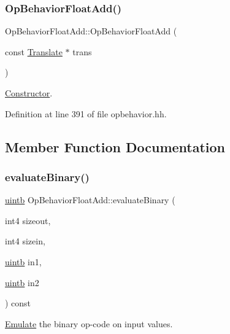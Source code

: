 \subsubsection{\texorpdfstring{OpBehaviorFloatAdd()}{OpBehaviorFloatAdd()}}
{\footnotesize\ttfamily Op\+Behavior\+Float\+Add\+::\+Op\+Behavior\+Float\+Add (\begin{DoxyParamCaption}\item[{const \mbox{\hyperlink{class_translate}{Translate}} $\ast$}]{trans }\end{DoxyParamCaption})\hspace{0.3cm}{\ttfamily [inline]}}



\mbox{\hyperlink{class_constructor}{Constructor}}. 



Definition at line 391 of file opbehavior.\+hh.



\subsection{Member Function Documentation}
\mbox{\label{class_op_behavior_float_add_a84fffa2528cb3928759345a67d79424f}} 
\subsubsection{\texorpdfstring{evaluateBinary()}{evaluateBinary()}}
{\footnotesize\ttfamily \mbox{\hyperlink{types_8h_a2db313c5d32a12b01d26ac9b3bca178f}{uintb}} Op\+Behavior\+Float\+Add\+::evaluate\+Binary (\begin{DoxyParamCaption}\item[{int4}]{sizeout,  }\item[{int4}]{sizein,  }\item[{\mbox{\hyperlink{types_8h_a2db313c5d32a12b01d26ac9b3bca178f}{uintb}}}]{in1,  }\item[{\mbox{\hyperlink{types_8h_a2db313c5d32a12b01d26ac9b3bca178f}{uintb}}}]{in2 }\end{DoxyParamCaption}) const\hspace{0.3cm}{\ttfamily [virtual]}}



\mbox{\hyperlink{class_emulate}{Emulate}} the binary op-\/code on input values. 


